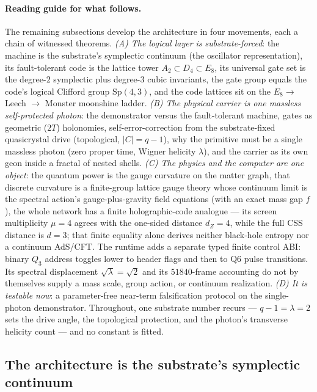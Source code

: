 \documentclass[11pt]{article}
\begin{document}
\paragraph{Reading guide for what follows.} The remaining subsections develop the
architecture in four movements, each a chain of witnessed theorems.
\emph{(A) The logical layer is substrate-forced}: the machine is the substrate's
symplectic continuum (the oscillator representation), its fault-tolerant code is
the lattice tower $A_2\subset D_4\subset E_8$, its universal gate set is the
degree-$2$ symplectic plus degree-$3$ cubic invariants, the gate group equals the
code's logical Clifford group $\mathrm{Sp}(4,3)$, and the code lattices sit on the
$E_8\to$ Leech $\to$ Monster moonshine ladder.
\emph{(B) The physical carrier is one massless self-protected photon}: the
demonstrator versus the fault-tolerant machine, gates as geometric ($2T$)
holonomies, self-error-correction from the substrate-fixed quasicrystal drive
(topological, $|C|=q-1$), why the primitive must be a single massless photon
(zero proper time, Wigner helicity $\lambda$), and the carrier as its own geon
inside a fractal of nested shells.
\emph{(C) The physics and the computer are one object}: the quantum power is the
gauge curvature on the matter graph, that discrete curvature is a finite-group
lattice gauge theory whose continuum limit is the spectral action's
gauge-plus-gravity field equations (with an exact mass gap $f$), the whole
network has a finite holographic-code analogue --- its screen multiplicity
$\mu=4$ agrees with the one-sided distance $d_Z=4$, while the full CSS distance
is $d=3$; that finite equality alone derives neither black-hole entropy nor a
continuum AdS/CFT.  The runtime adds a separate typed finite control ABI:
binary $Q_3$ address toggles lower to header flags and then to Q6 pulse
transitions.  Its spectral displacement $\sqrt\lambda=\sqrt2$ and its
$51840$-frame accounting do not by themselves supply a mass scale, group
action, or continuum realization.
\emph{(D) It is testable now}: a parameter-free near-term falsification protocol
on the single-photon demonstrator.
Throughout, one substrate number recurs --- $q-1=\lambda=2$ sets the drive angle,
the topological protection, and the photon's transverse helicity count --- and no
constant is fitted.

\subsection{The architecture is the substrate's symplectic continuum}
\end{document}
